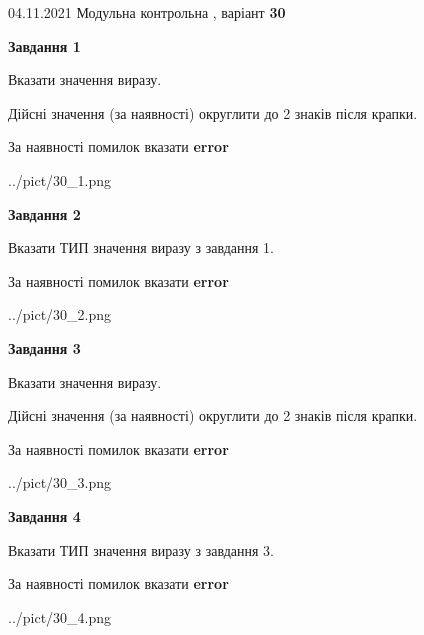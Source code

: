 \documentclass[11pt, ukrainian]{article}
\begin{document}
{04.11.2021 Модульна контрольна , варіант  \No \textbf { 30 }\par}
{
\begin {large}
{\begin {center}\textbf{Завдання 1}\end {center}}\par
Вказати значення виразу. \par
Дійсні значення (за наявності) округлити до 2 знаків після крапки. \par
За наявності помилок вказати \textbf{error}

\begin{center}
	{../pict/30_1.png}
\end{center}
\newpage

{\begin {center}\textbf{Завдання 2}\end {center}}\par
Вказати ТИП значення виразу з завдання 1. \par
За наявності помилок вказати \textbf{error}

\begin{center}
	{../pict/30_2.png}
\end{center}
\newpage

{\begin {center}\textbf{Завдання 3}\end {center}}\par
Вказати значення виразу. \par
Дійсні значення (за наявності) округлити до 2 знаків після крапки. \par
За наявності помилок вказати \textbf{error}

\begin{center}
	{../pict/30_3.png}
\end{center}
\newpage

{\begin {center}\textbf{Завдання 4}\end {center}}\par
Вказати ТИП значення виразу з завдання 3. \par
За наявності помилок вказати \textbf{error}

\begin{center}
	{../pict/30_4.png}
\end{center}
\newpage


\end{large}}
\end{document}
